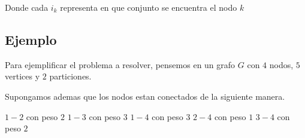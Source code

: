 Donde cada $i_k$ representa en que conjunto se encuentra el nodo $k$

\subsection{Ejemplo}

Para ejemplificar el problema a resolver, pensemos en un grafo $G$ con $4$ nodos, $5$ vertices y $2$ particiones.

Supongamos ademas que los nodos estan conectados de la siguiente manera.

$1-2$ con peso $2$
$1-3$ con peso $3$
$1-4$ con peso $3$
$2-4$ con peso $1$
$3-4$ con peso $2$

